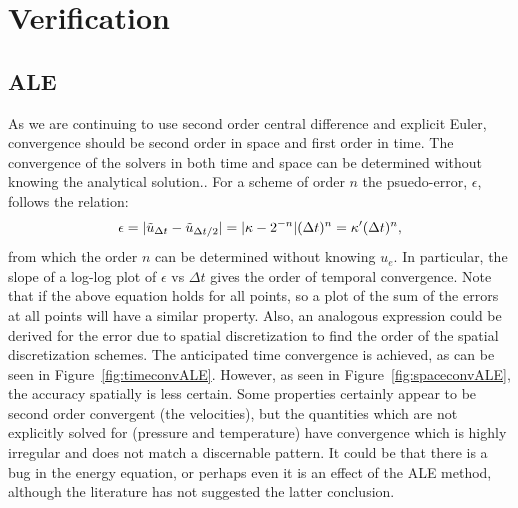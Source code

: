\documentclass{article}
\begin{document}
%
%

\section{Verification}

\subsection{ALE}

As we are continuing to use second order central difference and explicit Euler, convergence should be second order in space and first order in time. The convergence of the solvers in both time and space can be determined without knowing the analytical solution.\cite{macart}. For a scheme of order $n$ the psuedo-error, $\epsilon$, follows the relation:
\begin{equation}
\centering
\epsilon = |\tilde{u}_{\Delta t} - \tilde{u}_{\Delta t/2}| = |\kappa - 2^{-n}| (\Delta t)^n = \kappa' (\Delta t)^n ,
\label{eqn:error2}
\end{equation}
from which the order $n$ can be determined without knowing $u_e$. In particular, the slope of a log-log plot of $\epsilon$ vs $\Delta t$ gives the order of temporal convergence. Note that if the above equation holds for all points, so a plot of the sum of the errors at all points will have a similar property. Also, an analogous expression could be derived for the error due to spatial discretization to find the order of the spatial discretization schemes.  The anticipated time convergence is achieved, as can be seen in Figure~\ref{fig:timeconvALE}.  However, as seen in Figure~\ref{fig:spaceconvALE}, the accuracy spatially is less certain.  Some properties certainly appear to be second order convergent (the velocities), but the quantities which are not explicitly solved for (pressure and temperature) have convergence which is highly irregular and does not match a discernable pattern.  It could be that there is a bug in the energy equation, or perhaps even it is an effect of the ALE method, although the literature has not suggested the latter conclusion.
\end{document}
